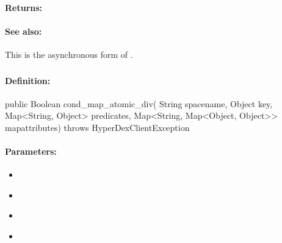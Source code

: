 \paragraph{Returns:}


\paragraph{See also:}  This is the asynchronous form of .

\pagebreak
\subsubsection{}
\label{api:java:cond_map_atomic_div}


\paragraph{Definition:}
\begin{javacode}
public Boolean cond_map_atomic_div(
        String spacename,
        Object key,
        Map<String, Object> predicates,
        Map<String, Map<Object, Object>> mapattributes) throws HyperDexClientException
\end{javacode}

\paragraph{Parameters:}
\begin{itemize}[noitemsep]
\item {}\\

\item {}\\

\item {}\\

\item {}\\

\end{itemize}

